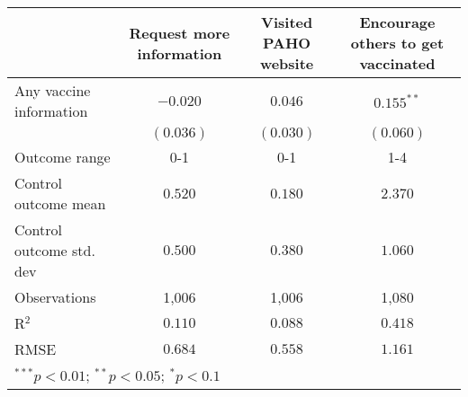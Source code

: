 \begin{table}
\begin{center}
\begin{tabular}{l c c c}
\hline
 & Request more information & Visited PAHO website & Encourage others to get vaccinated \\
\hline
Any vaccine information  & $-0.020$  & $0.046$   & $0.155^{**}$ \\
                         & $(0.036)$ & $(0.030)$ & $(0.060)$    \\
\hline
Outcome range            & 0-1       & 0-1       & 1-4          \\
Control outcome mean     & $0.520$   & $0.180$   & $2.370$      \\
Control outcome std. dev & $0.500$   & $0.380$   & $1.060$      \\
Observations             & 1,006     & 1,006     & 1,080        \\
R$^{2}$                  & $0.110$   & $0.088$   & $0.418$      \\
RMSE                     & $0.684$   & $0.558$   & $1.161$      \\
\hline
\multicolumn{4}{l}{\scriptsize{$^{***}p<0.01$; $^{**}p<0.05$; $^{*}p<0.1$}}
\end{tabular}
\caption{}
\label{table:Tables and Figures/SI_table21_anyinfo_Chile_behav}
\end{center}
\end{table}
